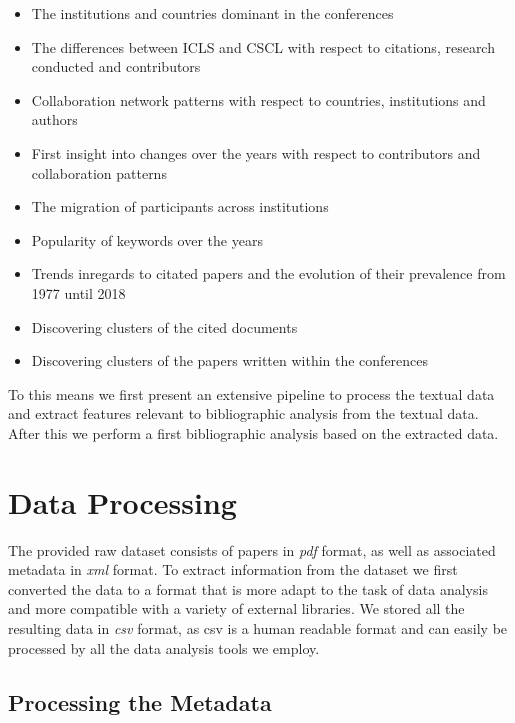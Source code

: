 \documentclass[article,twocolumn]{IEEEtran}
\providecommand{\tightlist}{%
      \setlength{\itemsep}{0pt}\setlength{\parskip}{0pt}}
\begin{document}
\begin{itemize}
\tightlist
\item
  The institutions and countries dominant in the conferences
\item
  The differences between ICLS and CSCL with respect to citations,
  research conducted and contributors
\item
  Collaboration network patterns with respect to countries, institutions
  and authors
\item
  First insight into changes over the years with respect to contributors
  and collaboration patterns
\item
  The migration of participants across institutions
\item
  Popularity of keywords over the years
\item
  Trends inregards to citated papers and the evolution of their
  prevalence from 1977 until 2018
\item
  Discovering clusters of the cited documents
\item
  Discovering clusters of the papers written within the conferences
\end{itemize}

To this means we first present an extensive pipeline to process the
textual data and extract features relevant to bibliographic analysis
from the textual data. After this we perform a first bibliographic
analysis based on the extracted data.

    \hypertarget{data-processing}{%
\section{Data Processing}\label{data-processing}}

    The provided raw dataset consists of papers in \emph{pdf} format, as
well as associated metadata in \emph{xml} format. To extract information
from the dataset we first converted the data to a format that is more
adapt to the task of data analysis and more compatible with a variety of
external libraries. We stored all the resulting data in \emph{csv}
format, as csv is a human readable format and can easily be processed by
all the data analysis tools we employ.

    \hypertarget{processing-the-metadata}{%
\subsection{Processing the Metadata}\label{processing-the-metadata}}
\end{document}
